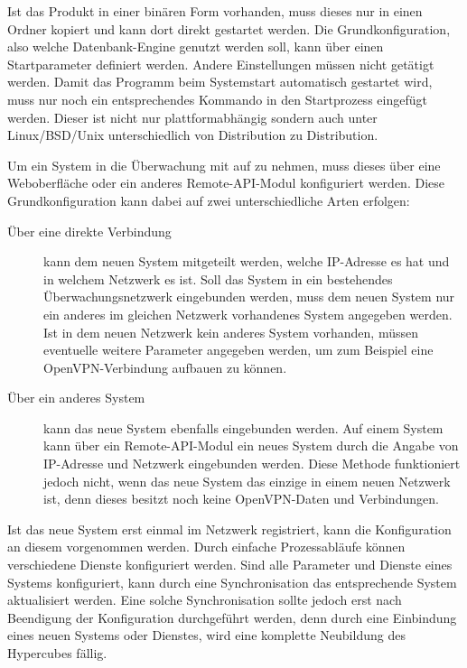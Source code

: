 Ist das Produkt in einer bin\"aren Form vorhanden, muss dieses nur in einen Ordner kopiert und kann dort direkt gestartet werden. Die Grundkonfiguration, also welche Datenbank-Engine genutzt werden soll, kann \"uber einen Startparameter definiert werden. Andere Einstellungen m\"ussen nicht get\"atigt werden. Damit das Programm beim Systemstart automatisch gestartet wird, muss nur noch ein entsprechendes Kommando in den Startprozess eingef\"ugt werden. Dieser ist nicht nur plattformabh\"angig sondern auch unter Linux/BSD/Unix unterschiedlich von Distribution zu Distribution.

Um ein System in die \"Uberwachung mit auf zu nehmen, muss dieses \"uber eine Weboberfl\"ache oder ein anderes Remote-API-Modul konfiguriert werden. Diese Grundkonfiguration kann dabei auf zwei unterschiedliche Arten erfolgen:

\begin{description}
 \item[\"Uber eine direkte Verbindung] kann dem neuen System mitgeteilt werden, welche IP-Adresse es hat und in welchem Netzwerk es ist. Soll das System in ein bestehendes \"Uberwachungsnetzwerk eingebunden werden, muss dem neuen System nur ein anderes im gleichen Netzwerk vorhandenes System angegeben werden. Ist in dem neuen Netzwerk kein anderes System vorhanden, m\"ussen eventuelle weitere Parameter angegeben werden, um zum Beispiel eine OpenVPN-Verbindung aufbauen zu k\"onnen.

 \item[\"Uber ein anderes System] kann das neue System ebenfalls eingebunden werden. Auf einem System kann \"uber ein Remote-API-Modul ein neues System durch die Angabe von IP-Adresse und Netzwerk eingebunden werden. Diese Methode funktioniert jedoch nicht, wenn das neue System das einzige in einem neuen Netzwerk ist, denn dieses besitzt noch keine OpenVPN-Daten und Verbindungen.
\end{description}

Ist das neue System erst einmal im Netzwerk registriert, kann die Konfiguration an diesem vorgenommen werden. Durch einfache Prozessabl\"aufe k\"onnen verschiedene Dienste konfiguriert werden. Sind alle Parameter und Dienste eines Systems konfiguriert, kann durch eine Synchronisation das entsprechende System aktualisiert werden. Eine solche Synchronisation sollte jedoch erst nach Beendigung der Konfiguration durchgef\"uhrt werden, denn durch eine Einbindung eines neuen Systems oder Dienstes, wird eine komplette Neubildung des Hypercubes f\"allig.

